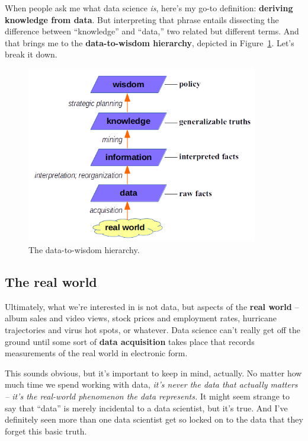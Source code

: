 
\label{dsDefinition}
When people ask me what data science \textit{is}, here's my go-to definition:
\textbf{deriving knowledge from data}. But interpreting that phrase entails
dissecting the difference between ``knowledge'' and ``data,'' two related but
different terms. And that brings me to the \textbf{data-to-wisdom hierarchy},
depicted in Figure~\ref{dataHierarchy}. Let's break it down.

\begin{figure}[ht]
\centering
\includegraphics[width=0.9\textwidth]{dataHierarchy.png}
\caption{The data-to-wisdom hierarchy.}
\label{dataHierarchy}
\end{figure}

\subsection{The real world}

Ultimately, what we're interested in is not data, but aspects of the
\textbf{real world} -- album sales and video views, stock prices and employment
rates, hurricane trajectories and virus hot spots, or whatever. Data science
can't really get off the ground until some sort of \textbf{data acquisition}
takes place that records measurements of the real world in electronic form.

This sounds obvious, but it's important to keep in mind, actually. No matter
how much time we spend working with data, \textit{it's never the data that
actually matters -- it's the real-world phenomenon the data represents.} It
might seem strange to say that ``data'' is merely incidental to a data
scientist, but it's true. And I've definitely seen more than one data scientist
get so locked on to the data that they forget this basic truth.

